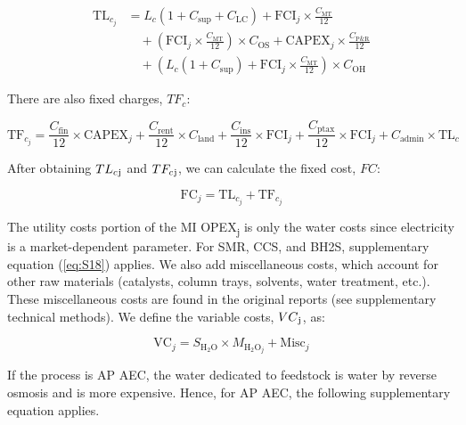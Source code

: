 \documentclass{article}
\begin{document}
\begin{equation}
\begin{aligned}
\text{TL}_{c_j} &= L_c \left(1 + C_{\text{sup}} + C_{\text{LC}}\right) + \text{FCI}_j \times \frac{C_{\text{MT}}}{12} \\
&\quad + \left(\text{FCI}_j \times \frac{C_{\text{MT}}}{12}\right) \times C_{\text{OS}} + \text{CAPEX}_j \times \frac{C_{\text{P\&R}}}{12} \\
&\quad + \left( L_c \left(1 + C_{\text{sup}}\right) + \text{FCI}_j \times \frac{C_{\text{MT}}}{12} \right) \times C_{\text{OH}}
\end{aligned}
\label{eq:S15}
\end{equation}

There are also fixed charges, \( TF_c \):

\begin{equation}
\text{TF}_{c_j} = \frac{C_{\text{fin}}}{12} \times \text{CAPEX}_j + \frac{C_{\text{rent}}}{12} \times C_{\text{land}} + \frac{C_{\text{ins}}}{12} \times \text{FCI}_j + \frac{C_{\text{ptax}}}{12} \times \text{FCI}_j + C_{\text{admin}} \times \text{TL}_c
\label{eq:S16}
\end{equation}

After obtaining \( TL_c\textsubscript{j} \) and \( TF_c\textsubscript{j} \), we can calculate the fixed cost, \( FC \):

\begin{equation}
\text{FC}_j = \text{TL}_{c_j} + \text{TF}_{c_j}
\label{eq:S17}
\end{equation}

The utility costs portion of the MI OPEX\textsubscript{j} is only the water costs since electricity is a market-dependent parameter. For SMR, CCS, and BH2S, supplementary equation (\ref{eq:S18}) applies. We also add miscellaneous costs, which account for other raw materials (catalysts, column trays, solvents, water treatment, etc.). These miscellaneous costs are found in the original reports (see supplementary technical methods). We define the variable costs, \( VC\textsubscript{j} \), as:

\begin{equation}
\text{VC}_j = S_{\text{H}_2\text{O}} \times M_{\text{H}_2\text{O}_j} + \text{Misc}_j
\label{eq:S18}
\end{equation}

If the process is AP AEC, the water dedicated to feedstock is water by reverse osmosis and is more expensive. Hence, for AP AEC, the following supplementary equation applies.
\end{document}
